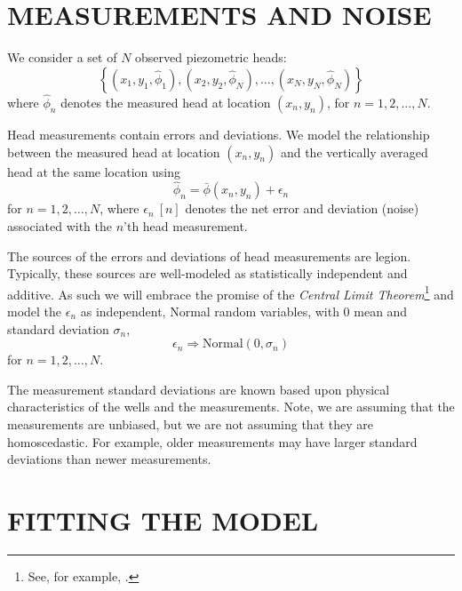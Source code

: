 \documentclass[12pt]{report}
\begin{document}
\chapter{MEASUREMENTS AND NOISE}
We consider a set of $N$ observed piezometric heads:
%
\begin{equation}\label{6.0.1}
	\left\{ (x_1,y_1,\hat{\phi}_1), (x_2,y_2,\hat{\phi}_N), \ldots, (x_N,y_N,\hat{\phi}_N) \right\}
\end{equation}
%
where $\hat{\phi}_n$ denotes the measured head at location $(x_n,y_n)$, for $n = 1, 2, \ldots, N$.

Head measurements contain errors and deviations.  We model the relationship between the measured head at location $(x_n, y_n)$ and the vertically averaged head at the same location using
%
\begin{equation}\label{6.0.2}
	\hat{\phi}_n = \bar{\phi}(x_n, y_n) + \epsilon_n
\end{equation}
%
for $n = 1, 2, \ldots, N$, where $\epsilon_n~[n]$ denotes the net error and deviation (noise) associated with the $n$'th head measurement.

The sources of the errors and deviations of head measurements are legion.  Typically, these sources are well-modeled as statistically independent and additive.  As such we will embrace the promise of the {\em Central Limit Theorem}\footnote{See, for example, \citet{wiki:clt}.} and model the $\epsilon_n$ as independent, Normal random variables, with $0$ mean and standard deviation $\sigma_n$,
%
\begin{equation}\label{6.0.3}
    \epsilon_n \Rightarrow \text{Normal}(0, \sigma_n)
\end{equation}
%
for $n=1,2,\ldots,N$.

The measurement standard deviations are known based upon physical characteristics of the wells and the measurements.  Note, we are assuming that the measurements are unbiased, but we are not assuming that they are homoscedastic. For example, older measurements may have larger standard deviations than newer measurements.



\chapter{FITTING THE MODEL}
\end{document}

